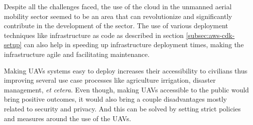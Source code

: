 Despite all the challenges faced, the use of the cloud in the unmanned aerial mobility sector seemed to be an area that can revolutionize and significantly contribute in the development of the sector. The use of various deployment techniques like infrastructure as code as described in section \ref{subsec:aws-cdk-setup} can also help in speeding up infrastructure deployment times, making the infrastructure agile and facilitating maintenance.

Making UAVs systems easy to deploy increases their accessibility to civilians thus improving several use case processes like agriculture irrigation, disaster management, \textit{et cetera}. Even though, making UAVs accessible to the public would bring positive outcomes, it would also bring a couple disadvantages mostly related to security and privacy. And this can be solved by setting strict policies and measures around the use of the UAVs.